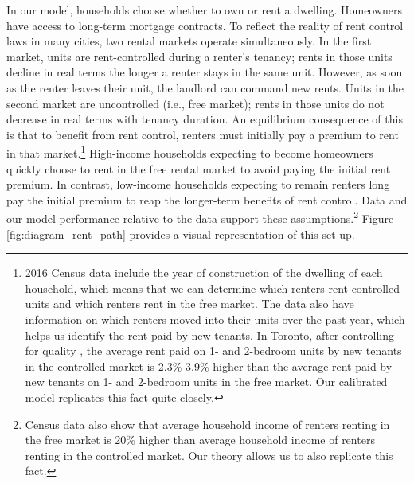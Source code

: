 \documentclass[parskip=full]{article}
\begin{document}
In our model, households choose whether to own or rent a dwelling. Homeowners have access to long-term mortgage contracts. To reflect the reality of rent control laws in many cities, two rental markets operate simultaneously. In the first market, units are rent-controlled during a renter's tenancy; rents in those units decline in real terms the longer a renter stays in the same unit. However, as soon as the renter leaves their unit, the landlord can command new rents. Units in the second market are uncontrolled (i.e., free market); rents in those units do not decrease in real terms with tenancy duration. An equilibrium consequence of this is that to benefit from rent control, renters must initially pay a premium to rent in that market.\footnote{2016 Census data include the year of construction of the dwelling of each household, which means that we can determine which renters rent controlled units and which renters rent in the free market. The data also have information on which renters moved into their units over the past year, which helps us identify the rent paid by new tenants. In Toronto, after controlling for quality \citep{zhang-gou}, the average rent paid on 1- and 2-bedroom units by new tenants in the controlled market is 2.3\%-3.9\% higher than the average rent paid by new tenants on 1- and 2-bedroom units in the free market. Our calibrated model replicates this fact quite closely.} High-income households expecting to become homeowners quickly choose to rent in the free rental market to avoid paying the initial rent premium. In contrast, low-income households expecting to remain renters long pay the initial premium to reap the longer-term benefits of rent control. Data and our model performance relative to the data support these assumptions.\footnote{Census data also show that average household income of renters renting in the free market is 20\% higher than average household income of renters renting in the controlled market. Our theory allows us to also replicate this fact.} Figure \ref{fig:diagram_rent_path} provides a visual representation of this set up.

\end{document}
